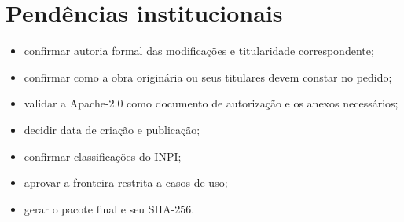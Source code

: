 \documentclass[11pt,a4paper]{article}
\begin{document}
\section{Pendências institucionais}

\begin{itemize}
  \item confirmar autoria formal das modificações e titularidade correspondente;
  \item confirmar como a obra originária ou seus titulares devem constar no pedido;
  \item validar a Apache-2.0 como documento de autorização e os anexos necessários;
  \item decidir data de criação e publicação;
  \item confirmar classificações do INPI;
  \item aprovar a fronteira restrita a casos de uso;
  \item gerar o pacote final e seu SHA-256.
\end{itemize}
\end{document}
